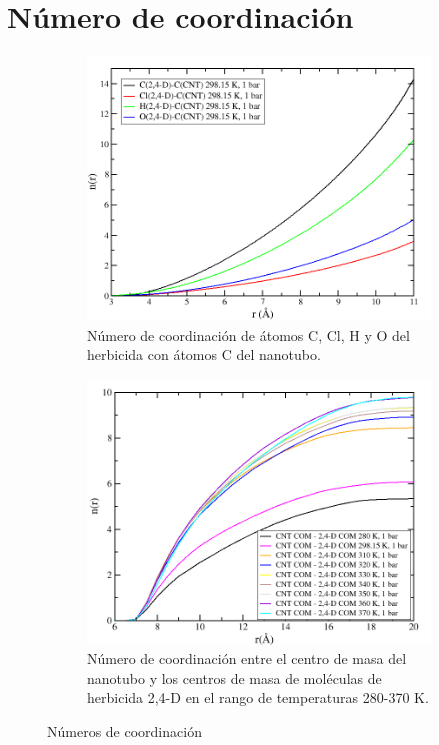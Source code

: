 \section{Número de coordinación}

\begin{figure}[!ht]
\begin{subfigure}{.5\textwidth}
  \centering
  \includegraphics[width=1\linewidth]{resultados/gr_24D_CNT_298_15_atom_atom_cn_alt.png}  
  \caption{Número de coordinación de átomos C, Cl, H y O del herbicida con átomos C del nanotubo.}
  \label{fig:24D_CNT_298_15_atom_atom_cn}
\end{subfigure}
\begin{subfigure}{.5\textwidth}
  \centering
  \includegraphics[width=1\linewidth]{resultados/cmnt_cmd_alltemp.png}  
  \caption{Número de coordinación entre el centro de masa del nanotubo y los centros de masa de moléculas de herbicida 2,4-D en el rango de temperaturas 280-370 K.}
  \label{fig:24D_CNT_alltemp_CM-CM_cn}
\end{subfigure}
\caption{Números de coordinación}
\label{fig:24D_CNT_298_15_alltemp_atom_atom_cn}
\end{figure}

